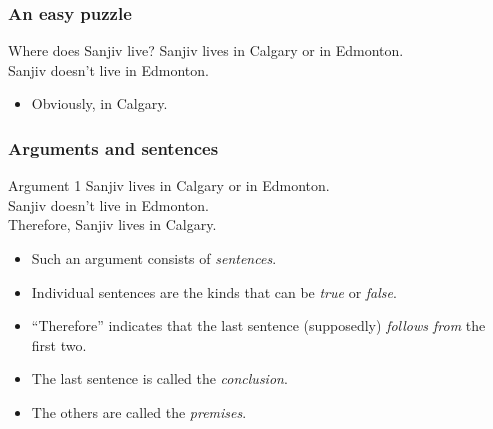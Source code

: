 \begin{frame}
  \frametitle{An easy puzzle}

  \begin{block}{Where does Sanjiv live?}
  Sanjiv lives in Calgary or in Edmonton.\\
  Sanjiv doesn't live in Edmonton.
  \end{block}

  \begin{itemize}
    \item<2>[A:] Obviously, in Calgary.
  \end{itemize}

\end{frame}

\begin{frame}
  \frametitle{Arguments and sentences}

  \begin{block}{Argument 1}
  Sanjiv lives in Calgary or in Edmonton.\\
  Sanjiv doesn't live in Edmonton.\\
  Therefore, Sanjiv lives in Calgary.
  \end{block}

  \begin{itemize}[<+->]
  \item Such an argument consists of \emph{sentences}.
  \item Individual sentences are the kinds that can be \emph{true} or \emph{false}.
  \item ``Therefore'' indicates that the last sentence (supposedly)
  \emph{follows from} the first two.
  \item The last sentence is called the \emph{conclusion}.
  \item The others are called the \emph{premises}.
  \end{itemize}

\end{frame}

